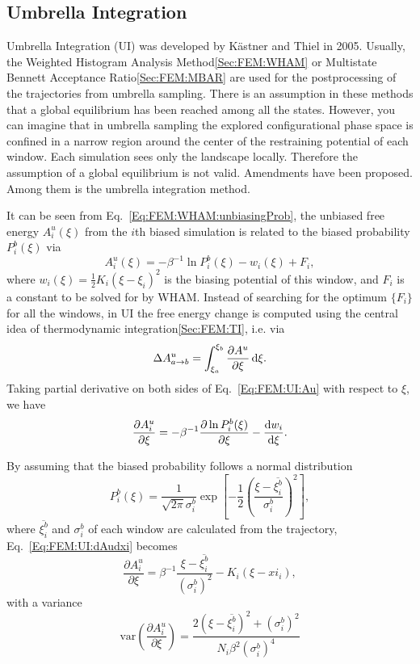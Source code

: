 \subsection{Umbrella Integration\label{Sec:FEM:UI}}
Umbrella Integration (UI) was developed by K\"astner and Thiel in 2005.\cite{KaestnerJCP2005} Usually, the Weighted Histogram Analysis Method\ref{Sec:FEM:WHAM} or Multistate Bennett Acceptance Ratio\ref{Sec:FEM:MBAR} are used for the postprocessing of the trajectories from umbrella sampling. There is an assumption in these methods that a global equilibrium has been reached among all the states. However, you can imagine that in umbrella sampling the explored configurational phase space is confined in a narrow region around the center of the restraining potential of each window. Each simulation sees only the landscape locally. Therefore the assumption of a global equilibrium is not valid. Amendments have been proposed. Among them is the umbrella integration method.

It can be seen from Eq.~\ref{Eq:FEM:WHAM:unbiasingProb}, the unbiased free energy $A_i^u(\xi)$ from the $i$th biased simulation is related to the biased probability $P_i^{b}(\xi)$ via
\begin{equation}
    A_i^u(\xi)=-\beta^{-1}\ln{P_i^{b}(\xi)}-w_i(\xi)+F_i,
    \label{Eq:FEM:UI:Au}
\end{equation}
where $w_i(\xi)=\frac{1}{2}K_i(\xi-\xi_i)^2$ is the biasing potential of this window, and $F_i$ is a constant to be solved for by WHAM. Instead of searching for the optimum $\{F_i\}$  for all the windows, in UI the free energy change is computed using the central idea of thermodynamic integration\ref{Sec:FEM:TI}, i.e. via
\begin{equation}
    \Delta A^u_{a\to b}=\int_{\xi_a}^{\xi_b}\frac{\partial A^u}{\partial \xi}\mathop{}\!\mathrm{d} \xi.
\end{equation}
Taking partial derivative on both sides of Eq.~\ref{Eq:FEM:UI:Au} with respect to $\xi$, we have
\begin{equation}
    \frac{\partial A_i^u}{\partial \xi}=-\beta^{-1}\frac{\partial \ln{P_i^b(\xi)}}{\partial \xi}-\frac{\mathop{}\!\mathrm{d} w_i}{\mathop{}\!\mathrm{d} \xi}.
    \label{Eq:FEM:UI:dAudxi}
\end{equation}

By assuming that the biased probability follows a normal distribution
\begin{equation}
    P_i^b(\xi)=\frac{1}{\sqrt{2\pi}\sigma_i^b}\exp{\left[-\frac{1}{2}\left(\frac{\xi-\overline{\xi_i^b}}{\sigma_i^b}\right)^2\right]},
\end{equation}
where $\overline{\xi_i^b}$ and $\sigma_i^b$ of each window are calculated from the trajectory, Eq.~\ref{Eq:FEM:UI:dAudxi} becomes
\begin{equation}
    \frac{\partial A_i^u}{\partial \xi}=\beta^{-1}\frac{\xi-\overline{\xi_i^b}}{(\sigma_i^b)^2}-K_i(\xi-xi_i),
\end{equation}
with a variance\cite{KaestnerJCP2006}
\begin{equation}
    \mathrm{var}\left(\frac{\partial A_i^u}{\partial \xi}\right)=\frac{2(\xi-\overline{\xi_i^b})^2+(\sigma_i^b)^2}{N_i\beta^2(\sigma_i^b)^4}
\end{equation}

